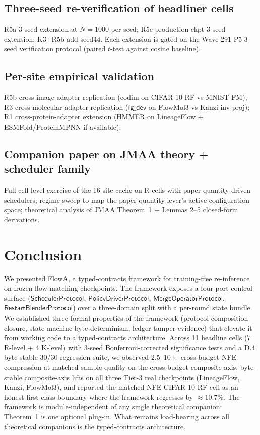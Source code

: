 \documentclass[journal,twocolumn,final]{IEEEtran}
\begin{document}
\subsection*{Three-seed re-verification of headliner cells}

R5a 3-seed extension at $N = 1000$ per seed; R5c production ckpt 3-seed
extension; K3+R5b add seed44. Each extension is gated on the Wave 291 P5
3-seed verification protocol (paired $t$-test against cosine baseline).

\subsection*{Per-site empirical validation}

R5b cross-image-adapter replication (codim on CIFAR-10 RF vs MNIST FM); R3
cross-molecular-adapter replication ($\mathsf{fg\_dev}$ on FlowMol3 vs Kanzi
inv-proj); R1 cross-protein-adapter extension (HMMER on LineageFlow +
ESMFold/ProteinMPNN if available).

\subsection*{Companion paper on JMAA theory + scheduler family}

Full cell-level exercise of the 16-site cache on R-cells with
paper-quantity-driven schedulers; regime-sweep to map the paper-quantity
lever's active configuration space; theoretical analysis of JMAA Theorem~1 +
Lemmas 2--5 closed-form derivations.

\section{Conclusion}\label{sec:conclusion}

We presented FlowA, a typed-contracts framework for training-free re-inference
on frozen flow matching checkpoints. The framework exposes a four-port control
surface ($\mathsf{SchedulerProtocol}$, $\mathsf{PolicyDriverProtocol}$,
$\mathsf{MergeOperatorProtocol}$, $\mathsf{RestartBlenderProtocol}$) over a
three-domain split with a per-round state bundle. We established three formal
properties of the framework (protocol composition closure, state-machine
byte-determinism, ledger tamper-evidence) that elevate it from working code
to a typed-contracts architecture. Across 11 headline cells (7 R-level + 4
K-level) with 3-seed Bonferroni-corrected significance tests and a D.4
byte-stable 30/30 regression suite, we observed $2.5$--$10\times$ cross-budget
NFE compression at matched sample quality on the cross-budget composite axis,
byte-stable composite-axis lifts on all three Tier-3 real checkpoints
(LineageFlow, Kanzi, FlowMol3), and reported the matched-NFE CIFAR-10 RF cell
as an honest first-class boundary where the framework regresses by $\approx
10.7\%$. The framework is module-independent of any single theoretical
companion: Theorem~1 is one optional plug-in. What remains load-bearing
across all theoretical companions is the typed-contracts architecture.
\end{document}
